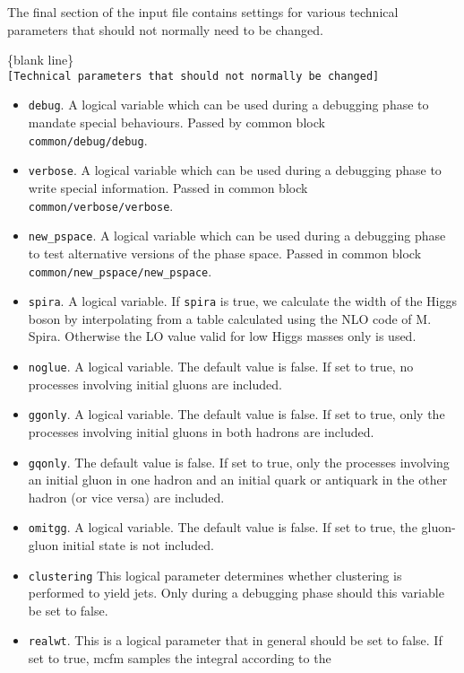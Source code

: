 \documentclass{article}
\begin{document}
The final section of the input file contains settings for various technical parameters that should not 
normally need to be changed.
\begin{center}
\{blank line\} \\
{\tt [Technical parameters that should not normally be changed]}
\end{center}
\begin{itemize}
\item {\tt debug}.  
A logical variable which can be used during a 
debugging phase to mandate special behaviours. 
Passed by common block \\
{\tt common/debug/debug}.
\item {\tt verbose}.  
A logical variable which can be used during a debugging phase to write 
special information. Passed in common block \\
{\tt common/verbose/verbose}.
\item {\tt new\_pspace}.  
A logical variable which can be used during a debugging phase to test alternative versions of the phase space.
Passed in common block {\tt common/new\_pspace/new\_pspace}.
\item {\tt spira}.  
A logical variable. If {\tt spira} is true, we calculate the 
width of the Higgs boson by interpolating from a table
calculated using the NLO code of M. Spira.
Otherwise the LO value valid for low Higgs masses only is used.
\item {\tt noglue}.  
A logical variable. 
The default value is false. If set to true, no processes
involving initial gluons are included.
\item {\tt ggonly}.  
A logical variable. 
The default value is false. If set to true, 
only the processes
involving initial gluons in both hadrons are included.
\item {\tt gqonly}.  
The default value is false. If set to true, 
only the processes
involving an initial gluon in one hadron and an initial quark
or antiquark in the other hadron (or vice versa) are included.
\item {\tt omitgg}.  
A logical variable. 
The default value is false. If set to true, the gluon-gluon
initial state is not included.
\item {\tt clustering}
This logical parameter determines whether clustering is performed to yield
jets. Only during a debugging phase should this variable be set to false. 
\item {\tt realwt}.  
This is a logical parameter that in general should be set to false.
If set to true, mcfm samples the integral according to the

\end{itemize}
\end{document}
